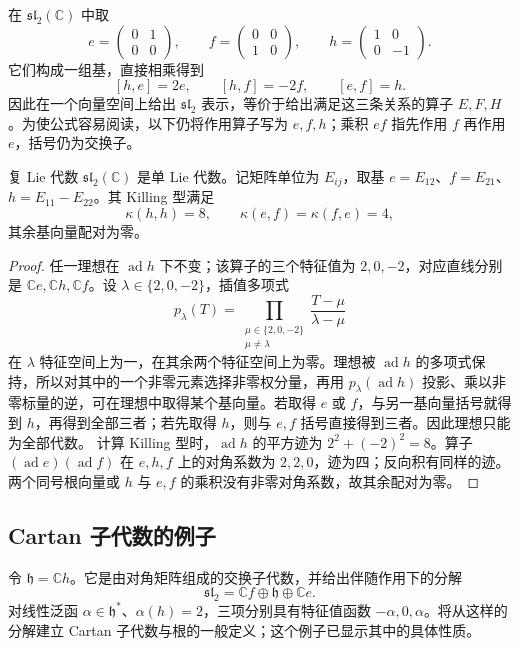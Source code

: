 在 \(\mathfrak{sl}_2(\mathbb C)\) 中取
\[
	e=\begin{pmatrix}0&1\\0&0\end{pmatrix},\qquad
	f=\begin{pmatrix}0&0\\1&0\end{pmatrix},\qquad
	h=\begin{pmatrix}1&0\\0&-1\end{pmatrix}.
\]
它们构成一组基，直接相乘得到
\[
	[h,e]=2e,\qquad [h,f]=-2f,\qquad [e,f]=h.
\]
因此在一个向量空间上给出 \(\mathfrak{sl}_2\) 表示，等价于给出满足这三条关系的算子 \(E,F,H\)。为使公式容易阅读，以下仍将作用算子写为 \(e,f,h\)；乘积 \(ef\) 指先作用 \(f\) 再作用 \(e\)，括号仍为交换子。
\begin{proposition}\label{b5:prop:sl2-simple}
	复 Lie 代数 \(\mathfrak{sl}_2(\mathbb C)\) 是单 Lie 代数。记矩阵单位为 \(E_{ij}\)，取基 \(e=E_{12}\)、\(f=E_{21}\)、\(h=E_{11}-E_{22}\)。其 Killing 型满足
	\[
		\kappa(h,h)=8,\qquad \kappa(e,f)=\kappa(f,e)=4,
	\]
	其余基向量配对为零。
\end{proposition}
\begin{proof}
	任一理想在 \(\operatorname{ad}h\) 下不变；该算子的三个特征值为 \(2,0,-2\)，对应直线分别是 \(\mathbb Ce,\mathbb Ch,\mathbb Cf\)。设 \(\lambda\in\{2,0,-2\}\)，插值多项式
	\[
		p_\lambda(T)=\prod_{\substack{\mu\in\{2,0,-2\}\\\mu\ne\lambda}} \frac{T-\mu}{\lambda-\mu}
	\]
	在 \(\lambda\) 特征空间上为一，在其余两个特征空间上为零。理想被 \(\operatorname{ad}h\) 的多项式保持，所以对其中的一个非零元素选择非零权分量，再用 \(p_\lambda(\operatorname{ad}h)\) 投影、乘以非零标量的逆，可在理想中取得某个基向量。若取得 \(e\) 或 \(f\)，与另一基向量括号就得到 \(h\)，再得到全部三者；若先取得 \(h\)，则与 \(e,f\) 括号直接得到三者。因此理想只能为全部代数。 计算 Killing 型时，\(\operatorname{ad}h\) 的平方迹为 \(2^2+(-2)^2=8\)。算子 \((\operatorname{ad}e)(\operatorname{ad}f)\) 在 \(e,h,f\) 上的对角系数为 \(2,2,0\)，迹为四；反向积有同样的迹。两个同号根向量或 \(h\) 与 \(e,f\) 的乘积没有非零对角系数，故其余配对为零。
\end{proof}

\subsection{Cartan 子代数的例子}
\label{b5:subsec:1401:02}

令 \(\mathfrak h=\mathbb Ch\)。它是由对角矩阵组成的交换子代数，并给出伴随作用下的分解
\[
	\mathfrak{sl}_2=\mathbb Cf\oplus\mathfrak h\oplus\mathbb Ce.
\]
对线性泛函 \(\alpha\in\mathfrak h^*\)、\(\alpha(h)=2\)，三项分别具有特征值函数 \(-\alpha,0,\alpha\)。将从这样的分解建立 Cartan 子代数与根的一般定义；这个例子已显示其中的具体性质。

